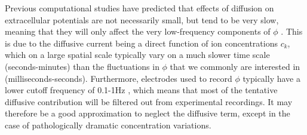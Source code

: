 Previous computational studies have predicted that effects of diffusion on extracellular potentials are not necessarily small, but tend to be very slow, meaning that they will only affect the very low-frequency components of $\phi$ \citep{Halnes2016, Halnes2017}. This is due to the diffusive current being a direct function of ion concentrations $c_k$, which on a large spatial scale typically vary on a much slower time scale (seconds-minutes) than the fluctuations in $\phi$ that we commonly are interested in (milliseconds-seconds). Furthermore, electrodes used to record $\phi$ typically have a lower cutoff frequency of 0.1-1Hz \citep{Einevoll2013}, which means that most of the tentative diffusive contribution will be filtered out from experimental recordings. It may therefore be a good approximation to neglect the diffusive term, except in the case of pathologically dramatic concentration variations.
